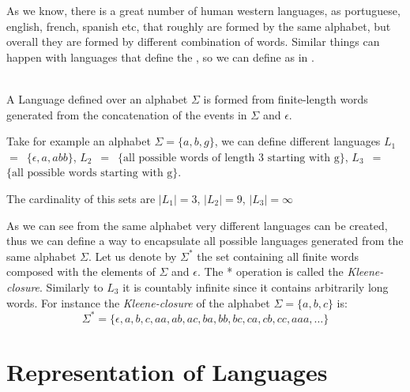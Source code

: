 As we know, there is a great number of human western languages, as portuguese, english,
french, spanish etc, that roughly are formed by the same alphabet, but overall
they are formed by different combination of words.  
Similar things can happen with languages that define the \DESs, so we can define
as in \cite{cassandras2009introduction}.
\pagebreak
\begin{definition}[Language]
\label{def:language}~\\  
A Language defined over an alphabet $\Sigma$ is formed from 
finite-length words generated from the concatenation of the events in
$\Sigma$ and $\epsilon$.
\end{definition}

Take for example an alphabet $\Sigma = \{a,b,g\}$, we can define different
languages $L_1$~$=$~$\{\epsilon, a, abb\}$, $L_2$~$=$~$\{\text{all possible words of length 3
starting with g}\}$, $L_3$~$=$~$\{\text{all possible words 
starting with g}\}$.

The
cardinality of this sets are $|L_1|=3$, $|L_2|=9$, $|L_3|=\infty$

As we can see from the same alphabet very different languages can be created,
thus we can define a way to encapsulate all possible languages generated from
the same alphabet $\Sigma$.
Let us denote by $\Sigma^*$ the set containing all finite words composed with
the elements of $\Sigma$ and $\epsilon$. The * operation is called the
\textit{Kleene-closure}. Similarly to $L_3$ it is countably infinite since it
contains arbitrarily long words. For instance the \textit{Kleene-closure} of the
alphabet $\Sigma = \{a, b, c\}$ is:
\begin{equation*}
  \label{eq:kleeneExample}
 \Sigma^* = \{\epsilon,a,b,c,aa,ab,ac,ba,bb,bc,ca,cb,cc,aaa,\dots\} 
\end{equation*}

\section{Representation of Languages}
\label{sec:representationLanguages}



